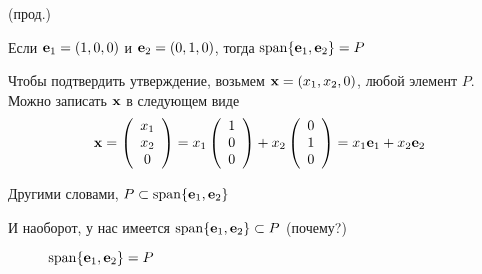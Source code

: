 \begin{frame}

    \vspace{2em}
    \Eg (прод.)
    
    Если ${\mathbf e}_1 = (1,0,0)$ и ${\mathbf e}_2=(0,1,0)$, тогда $\operatorname{span}\{{\mathbf e}_1, {\mathbf e}_2\} = P$ 
    
   Чтобы подтвердить утверждение, возьмем ${\mathbf x} = (x_1, x_2, 0)$, любой элемент $P$. 
   Можно записать ${\mathbf x}$ в следующем виде  
    \begin{equation*}
        {\mathbf x} = 
        \left(
        \begin{array}{c}
            x_1 \\
            x_2 \\
            0
        \end{array}
        \right)
        =
        x_1
        \left(
        \begin{array}{c}
            1 \\
            0 \\
            0
        \end{array}
        \right)
        + 
        x_2
        \left(
        \begin{array}{c}
            0 \\
            1 \\
            0
        \end{array}
        \right)
        = x_1 {\mathbf e}_1 + x_2 {\mathbf e}_2
    \end{equation*}

    Другими словами, $P \subset \operatorname{span}\{{\mathbf e}_1, {\mathbf e}_2\}$

    И наоборот, у нас имеется $\operatorname{span}\{{\mathbf e}_1, {\mathbf e}_2\} \subset P$ (почему?)


\end{frame}


\begin{frame}

    \vspace{2em}
    \begin{figure}
       \begin{center}
       \end{center}
       \caption{$\operatorname{span}\{{\mathbf e}_1, {\mathbf e}_2\} = P$}
    \end{figure}


\end{frame}

